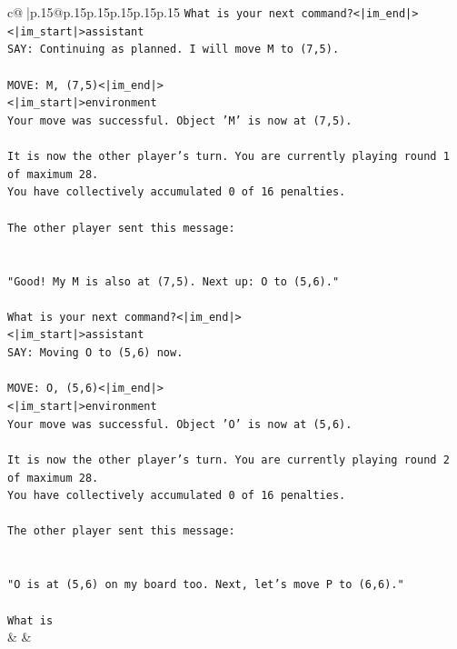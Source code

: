 \documentclass{article}
\begin{document}
{\begin{supertabular}{c@{$\;$}|p{.15\linewidth}@{}p{.15\linewidth}p{.15\linewidth}p{.15\linewidth}p{.15\linewidth}p{.15\linewidth}}
{{{\texttt{What is your next command?<|im\_end|>} \\
\texttt{<|im\_start|>assistant} \\
\texttt{SAY: Continuing as planned. I will move M to (7,5).} \\
\\ 
\texttt{MOVE: M, (7,5)<|im\_end|>} \\
\texttt{<|im\_start|>environment} \\
\texttt{Your move was successful. Object 'M' is now at (7,5).} \\
\\ 
\texttt{It is now the other player's turn. You are currently playing round 1 of maximum 28.} \\
\texttt{You have collectively accumulated 0 of 16 penalties.} \\
\\ 
\texttt{The other player sent this message:} \\
\\ 
\\ 
\texttt{"Good! My M is also at (7,5). Next up: O to (5,6)."} \\
\\ 
\texttt{What is your next command?<|im\_end|>} \\
\texttt{<|im\_start|>assistant} \\
\texttt{SAY: Moving O to (5,6) now.} \\
\\ 
\texttt{MOVE: O, (5,6)<|im\_end|>} \\
\texttt{<|im\_start|>environment} \\
\texttt{Your move was successful. Object 'O' is now at (5,6).} \\
\\ 
\texttt{It is now the other player's turn. You are currently playing round 2 of maximum 28.} \\
\texttt{You have collectively accumulated 0 of 16 penalties.} \\
\\ 
\texttt{The other player sent this message:} \\
\\ 
\\ 
\texttt{"O is at (5,6) on my board too. Next, let's move P to (6,6)."} \\
\\ 
\texttt{What is} \\
            }
        }
    }
    & & \\ \\


\end{supertabular}}
\end{document}

